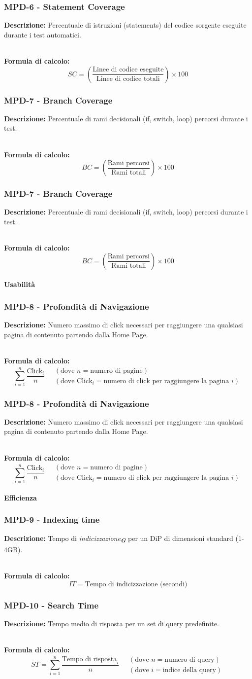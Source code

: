 \documentclass[a4paper,12pt]{article}
\newcommand{\glossario}[1]{\textit{#1}\textsubscript{\textbf{\textit{\textcolor{lightblack}{G}}}}}
\newcommand{\metricdef}[3]{
    \subsubsection*{#1 - #2}
    \textbf{Descrizione:} #3
}
\newcommand{\metricformula}[1]{
    \\[0.5em]
    \textbf{Formula di calcolo:}
    \begin{equation*}
        #1
    \end{equation*}
}
\begin{document}
\metricdef{MPD-6}{Statement Coverage}{Percentuale di istruzioni (statements) del codice sorgente eseguite durante i test automatici.}
\metricformula{SC = \left( \frac{\text{Linee di codice eseguite}}{\text{Linee di codice totali}} \right) \times 100}

\metricdef{MPD-7}{Branch Coverage}{Percentuale di rami decisionali (if, switch, loop) percorsi durante i test.}
\metricformula{BC = \left( \frac{\text{Rami percorsi}}{\text{Rami totali}} \right) \times 100}
\metricdef{MPD-7}{Branch Coverage}{Percentuale di rami decisionali (if, switch, loop) percorsi durante i test.}
\metricformula{BC = \left( \frac{\text{Rami percorsi}}{\text{Rami totali}} \right) \times 100}

\paragraph{Usabilità}

\metricdef{MPD-8}{Profondità di Navigazione}{Numero massimo di click necessari per raggiungere una qualsiasi pagina di contenuto partendo dalla Home Page.}
\metricformula{\sum_{i=1}^{n} \frac{\text{Click}_i}{n} \quad \begin{array}{l} (\text{dove } n = \text{numero di pagine}) \\ (\text{dove } \text{Click}_i = \text{numero di click per raggiungere la pagina } i) \end{array}}
\metricdef{MPD-8}{Profondità di Navigazione}{Numero massimo di click necessari per raggiungere una qualsiasi pagina di contenuto partendo dalla Home Page.}
\metricformula{\sum_{i=1}^{n} \frac{\text{Click}_i}{n} \quad \begin{array}{l} (\text{dove } n = \text{numero di pagine}) \\ (\text{dove } \text{Click}_i = \text{numero di click per raggiungere la pagina } i) \end{array}}

\paragraph{Efficienza}

\metricdef{MPD-9}{Indexing time}{Tempo di \glossario{indicizzazione} per un DiP di dimensioni standard (1-4GB).}
\metricformula{IT = \text{Tempo di indicizzazione (secondi)}}

\metricdef{MPD-10}{Search Time}{Tempo medio di risposta per un set di query predefinite.}
\metricformula{ST = \sum_{i=1}^{n} \frac{\text{Tempo di risposta}_i}{n} \quad \begin{array}{l} (\text{dove } n = \text{numero di query}) \\ (\text{dove }i = \text{indice della query}) \end{array}}
\end{document}
